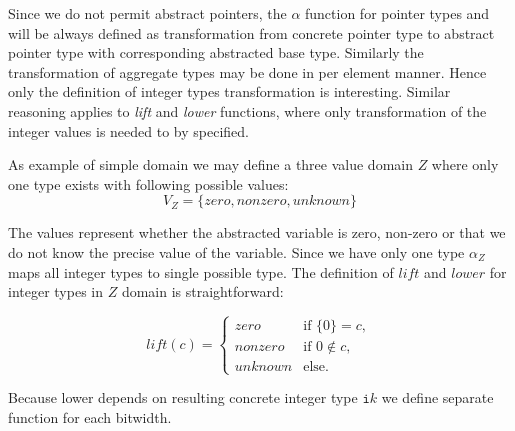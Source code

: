 %
%

Since we do not permit abstract pointers, the $\alpha$ function for pointer types and will be
always defined as transformation from concrete pointer type to abstract pointer
type with corresponding abstracted base type. Similarly the transformation of
aggregate types may be done in per element manner. Hence only the definition of
integer types transformation is interesting. Similar reasoning applies to
\textit{lift} and \textit{lower} functions, where only transformation of the
integer values is needed to by specified.

As example of simple domain we may define a three value domain $Z$ where only
one type exists with following possible values:
\[ V_{Z} = \{ \textit{zero}, \textit{nonzero}, \textit{unknown} \}\]


The values represent whether the abstracted variable is zero, non-zero or that we do
not know the precise value of the variable. Since we have only one type
$\alpha_{Z}$ maps all integer types to single possible type.
The definition of $\textit{lift}$ and $\textit{lower}$ for integer
types in $Z$ domain is straightforward:

\[
  lift(c) =
  \begin{cases}
    \textit{zero}    & \text{if } \{0\} = c, \\
    \textit{nonzero} & \text{if } 0 \not \in c, \\
    \textit{unknown} & \text{else.}
  \end{cases}
\]

\noindent
Because lower depends on resulting concrete integer type $\texttt{i}k$ we define separate
function for each bitwidth.

